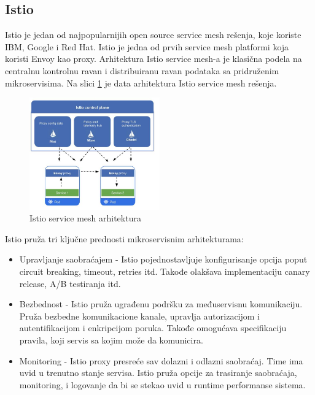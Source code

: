 \documentclass[a4paper,12pt]{report}
\begin{document}
\subsection{Istio}

Istio je jedan od najpopularnijih open source service mesh rešenja, koje koriste IBM, Google i Red Hat. Istio je jedna od prvih service mesh platformi koja koristi Envoy kao proxy. Arhitektura Istio service mesh-a je klasična podela na centralnu kontrolnu ravan i distribuiranu ravan podataka sa pridruženim mikroservisima. Na slici \ref{fig:istio-architecture} je data arhitektura Istio service mesh rešenja. \newline

\begin{figure}[h]
    \centering
    \includegraphics[width=0.5\textwidth]{istio_architecture}
    \caption{Istio service mesh arhitektura}
    \label{fig:istio-architecture}
\end{figure}

Istio pruža tri ključne prednosti mikroservisnim arhitekturama: 

\begin{itemize}
	\item Upravljanje saobraćajem - Istio pojednostavljuje konfigurisanje opcija poput circuit breaking, timeout, retries itd. Takođe olakšava implementaciju canary release, A/B testiranja itd. 
	\item Bezbednost - Istio pruža ugrađenu podršku za međuservisnu komunikaciju. Pruža bezbedne komunikacione kanale, upravlja autorizacijom i autentifikacijom i enkripcijom poruka. Takođe omogućava specifikaciju pravila, koji servis sa kojim može da komunicira. 
	\item Monitoring - Istio proxy presreće sav dolazni i odlazni saobraćaj. Time ima uvid u trenutno stanje servisa. Istio pruža opcije za trasiranje saobraćaja, monitoring, i logovanje da bi se stekao uvid u runtime performanse sistema. 
\end{itemize}
\end{document}
